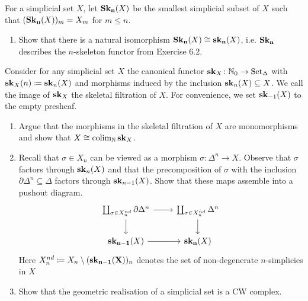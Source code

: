 \begin{Exercise}
    For a simplicial set $ X $, let $\bold{ Sk_n } ( X ) $ be the smallest simplicial subset of $ X $ such that $ ( \bold{ Sk_n } ( X ) )_m = X_m $ for $ m \leq n $.
    
    \begin{enumerate}
        \item 
        Show that there is a natural isomorphism $ \bold { Sk_n } ( X ) \cong \bold { sk_n } ( X ) $, i.e. $ \bold{ Sk_n } $ describes the $n$-skeleton functor from Exercise 6.2.
    \end{enumerate}
    
    Consider for any simplicial set $ X $ the canonical functor $ \bold{ sk }_X \colon \mathbb{ N }_0 \to \operatorname{Set}_{\Delta} $ with $ \bold{ sk }_X ( n ) \coloneqq \bold{ sk }_n ( X ) $ and morphisms induced by the inclusion $ \bold{ sk }_n ( X ) \subseteq X $.
    We call the image of $ \bold{ sk }_X $ the skeletal filtration of $ X $. 
    For convenience, we set $ \bold{ sk }_{-1} ( X ) $ to the empty presheaf.
    
    \begin{enumerate}[label=(\alph*), resume]
        \item 
        Argue that the morphisms in the skeletal filtration of $ X $ are monomorphisms and show that $ X \cong \operatorname{colim}_{ \mathbb{ N } } \bold{ sk }_X$.
    
        \item 
        Recall that $ \sigma \in X_n $ can be viewed as a morphism $ \sigma : \Delta^n \to X $.
        Observe that $ \sigma $ factors through $ \bold{ sk }_n ( X ) $ and that the precomposition of $ \sigma $ with the inclusion $ \partial \Delta^n \subseteq \Delta $ factors through $ \bold{ sk }_{n-1} ( X ) $.
        Show that these maps assemble into a pushout diagram.
        \[
        \begin{tikzcd}
            \coprod_{ \sigma \in X_n^{nd}} \partial \Delta^n
            \rar
            \dar
            &
            \coprod_{ \sigma \in X_n^{nd}} \Delta^n
            \dar
            \\
            \bold{sk_{n-1}}(X)
            \rar
            &
            \bold{sk_n}(X)
        \end{tikzcd}
    	\]
        Here $X_n^{nd} \coloneqq X_n \setminus ( \bold{ sk_{n-1} ( X ) })_n$ 
        denotes the set of non-degenerate $n$-simplicies in $ X$
    
        \item   
        Show that the geometric realisation of a simplicial set is a CW complex.
    \end{enumerate}
\end{Exercise}


